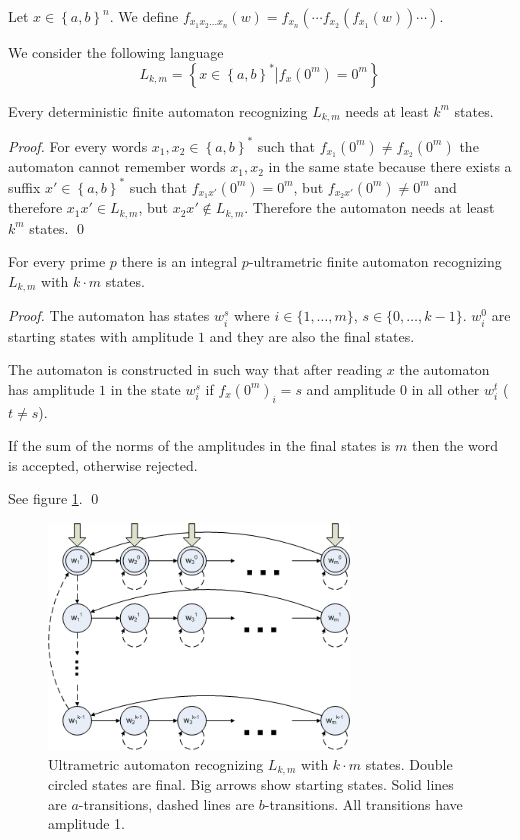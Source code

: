\documentclass{llncs}
\begin{document}
Let $x \in \left\{ a, b \right\} ^n$. We define $f_{x_1 x_2 \ldots x_n} \left( w \right) = f_{x_n} \left( \cdots f_{x_2} \left( f_{x_1} \left( w \right) \right) \cdots \right)$.

We consider the following language
$$
L_{k,m} = \left\{ x \in \left\{ a, b \right\}^* \left| f_x(0^m) = 0^m \right.  \right\}
$$


\begin{theorem}
Every deterministic finite automaton recognizing $L_{k,m}$ needs at least $k^m$ states.
\end{theorem}
\begin{proof}
For every words $x_1, x_2 \in \left\{ a,b \right\}^*$ such that $f_{x_1}(0^m) \not = f_{x_2}(0^m)$ the automaton cannot remember words $x_1, x_2$ in the same state because there exists a suffix $x' \in \left\{ a,b \right\}^*$ such that $f_{x_1 x'}(0^m) = 0^m$, but $f_{x_2 x'}(0^m) \not = 0^m$ and therefore $x_1 x' \in L_{k,m}$, but $x_2 x' \notin L_{k,m}$. Therefore the automaton needs at least $k^m$ states.
\qed
\end{proof}



\begin{theorem}
For every prime $p$ there is an integral $p$-ultrametric finite automaton recognizing $L_{k,m}$ with $k \cdot m$ states.
\end{theorem}
\begin{proof}
The automaton has states $w_i^s$ where $i \in \{1, \ldots, m\}$, $s \in \{0, \ldots, k-1\}$.
$w_i^0$ are starting states with amplitude $1$ and they are also the final states.

The automaton is constructed in such way that after reading $x$ the automaton has amplitude $1$ in the state $w_i^s$ if $f_x(0^m)_i = s$ and amplitude $0$ in all other $w_i^t$ ($t \not = s$).

If the sum of the norms of the amplitudes in the final states is $m$ then the word is accepted, otherwise rejected.

See figure \ref{autom1}.
\qed
\end{proof}

\begin{figure}[H]
  \centering
  \includegraphics[width = 8cm]{autom_km.png}
  \caption{Ultrametric automaton recognizing $L_{k,m}$ with $k \cdot m$ states.
  Double circled states are final.
  Big arrows show starting states.
  Solid lines are $a$-transitions, dashed lines are $b$-transitions.
  All transitions have amplitude 1. }
  \label{autom1}
\end{figure}
\end{document}
